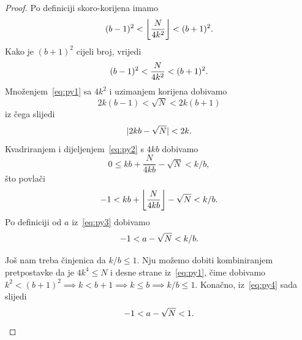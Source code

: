 \documentclass[12pt]{scrartcl}
\begin{document}
\begin{proof}
    Po definiciji skoro-korijena imamo
    \begin{equation}
        (b-1)^2 < \left\lfloor\frac{N}{4k^2}\right\rfloor < (b+1)^2\text.
    \end{equation}
    Kako je $(b+1)^2$ cijeli broj, vrijedi
    \begin{equation}\label{eq:py1}
        (b-1)^2 < \frac{N}{4k^2} < (b+1)^2\text.
    \end{equation}
    Množenjem~\eqref{eq:py1} sa $4k^2$ i uzimanjem korijena dobivamo
    \begin{equation}
        2k(b-1) < \sqrt{N} < 2k(b+1)
    \end{equation}
    iz čega slijedi
    \begin{equation}\label{eq:py2}
        |2kb - \sqrt{N}| < 2k\text.
    \end{equation}
    Kvadriranjem i dijeljenjem~\eqref{eq:py2} s $4kb$ dobivamo
    \begin{equation}\label{eq:py3}
        0 \leq kb + \frac{N}{4kb} - \sqrt{N} < k/b,
    \end{equation}
    što povlači
    \begin{equation}
        -1 < kb + \left\lfloor\frac{N}{4kb}\right\rfloor - \sqrt{N} < k/b\text.
    \end{equation}
    Po definiciji od $a$ iz~\eqref{eq:py3} dobivamo 
    \begin{equation}\label{eq:py4}
        -1 < a - \sqrt{N} < k/b\text.
    \end{equation}
    
    Još nam treba činjenica da $k/b\leq1$. Nju možemo dobiti kombiniranjem pretpostavke da je $4k^4 \leq N$ i desne strane iz~\eqref{eq:py1},
    čime dobivamo $k^2 < (b+1)^2\implies k < b+1\implies k\leq b\implies k/b\leq 1$. Konačno, iz~\eqref{eq:py4} sada slijedi
    \begin{equation}
        -1 < a - \sqrt{N} < 1\text.
    \end{equation}
\end{proof}
\end{document}
